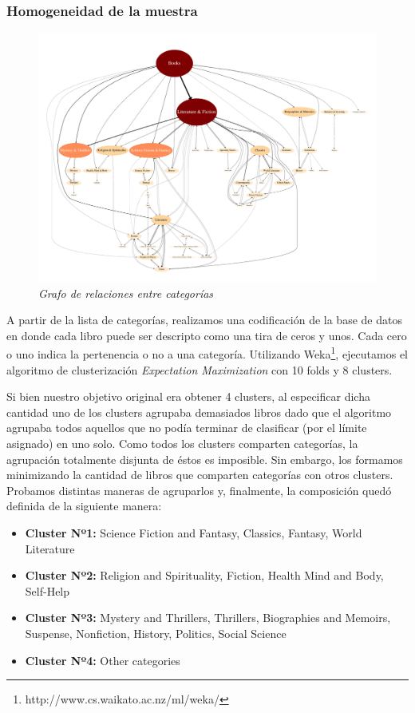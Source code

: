 \documentclass[12pt,journal,compsoc]{IEEEtran}
\begin{document}
\subsubsection{Homogeneidad de la muestra}

\begin{figure}[H]
  \centering
  \includegraphics[width=7.0in]{../results/graph.pdf}
  \caption{\small \textit{Grafo de relaciones entre categorías}}
  \label{fig:jerarquizacionDeCategorias}  
\end{figure}

A partir de la lista de categorías, realizamos una codificación de la base de datos en donde cada libro puede ser descripto como una tira de ceros y unos. Cada cero o uno indica la pertenencia o no a una categoría. Utilizando Weka\footnote{http://www.cs.waikato.ac.nz/ml/weka/}, ejecutamos el algoritmo de clusterización \textit{Expectation Maximization} con 10 folds y 8 clusters. 

Si bien nuestro objetivo original era obtener 4 clusters, al especificar dicha cantidad uno de los clusters agrupaba demasiados libros dado que el algoritmo agrupaba todos aquellos que no podía terminar de clasificar (por el límite asignado) en uno solo. Como todos los clusters comparten categorías, la agrupación totalmente disjunta de éstos es imposible. Sin embargo, los formamos minimizando la cantidad de libros que comparten categorías con otros clusters. Probamos distintas maneras de agruparlos y, finalmente, la composición quedó definida de la siguiente manera:\\

\begin{itemize}
\item \textbf{Cluster Nº1:} Science Fiction and Fantasy, Classics, Fantasy, World Literature
\item \textbf{Cluster Nº2:} Religion and Spirituality, Fiction, Health Mind and Body, Self-Help
\item \textbf{Cluster Nº3:} Mystery and Thrillers, Thrillers, Biographies and Memoirs, Suspense, Nonfiction, History, Politics, Social Science
\item \textbf{Cluster Nº4:} Other categories
\end{itemize}
\end{document}

